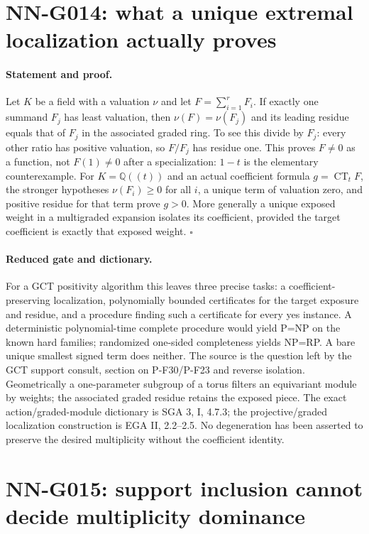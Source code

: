 \section{NN-G014: what a unique extremal localization actually proves}
\paragraph{Statement and proof.}
Let $K$ be a field with a valuation $\nu$ and let
$F=\sum_{i=1}^rF_i$. If exactly one summand $F_j$ has
least valuation, then
$\nu(F)=\nu(F_j)$ and its leading residue equals that of
$F_j$ in the associated graded ring. To see this divide
by $F_j$: every other ratio has positive valuation, so
$F/F_j$ has residue one. This proves $F\ne0$ as a
function, not $F(1)\ne0$ after a specialization: $1-t$
is the elementary counterexample.
For $K=\mathbb Q((t))$ and an actual coefficient formula
$g=\operatorname{CT}_tF$,
the stronger hypotheses $\nu(F_i)\ge0$ for all $i$, a unique
term of valuation zero, and positive residue for that term
prove $g>0$. More generally a unique exposed weight in a
multigraded expansion isolates its coefficient, provided
the target coefficient is exactly that exposed weight.
\hfill$\square$

\paragraph{Reduced gate and dictionary.}
For a GCT positivity algorithm this leaves three precise
tasks: a coefficient-preserving localization, polynomially
bounded certificates for the target exposure and residue,
and a procedure finding such a certificate for every yes
instance. A deterministic polynomial-time complete procedure
would yield P=NP on the known hard families; randomized
one-sided completeness yields NP=RP. A bare unique smallest
signed term does neither. The source is the question left
by the GCT support consult, section on P-F30/P-F23 and
reverse isolation. Geometrically a one-parameter subgroup
of a torus filters an equivariant module by weights; the
associated graded residue retains the exposed piece. The
exact action/graded-module dictionary is SGA 3, I, 4.7.3;
the projective/graded localization construction is EGA II,
2.2--2.5. No degeneration has been asserted to preserve
the desired multiplicity without the coefficient identity.



\section{NN-G015: support inclusion cannot decide multiplicity dominance}

